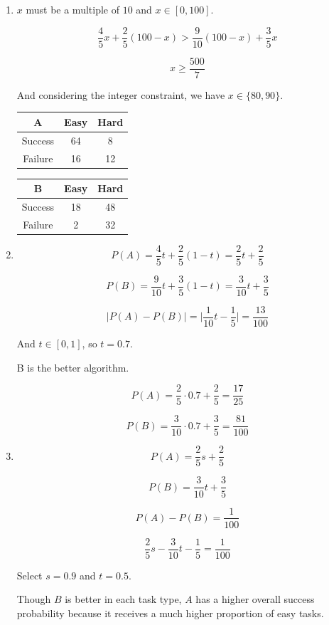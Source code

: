 \documentclass[11pt,a4paper]{article}
\begin{document}
\begin{enumerate}
    \item[(a)]

    $x$ must be a multiple of $10$ and $x \in [0,100]$.

    $$
    \frac{4}{5}x + \frac{2}{5}(100-x) > \frac{9}{10}(100-x) + \frac{3}{5}x
    $$

    $$
    x \geq \frac{500}{7}
    $$

    And considering the integer constraint, we have $x \in \{80, 90\}$.

    \begin{center}
    \begin{tabular}{ccc}
    \toprule A & Easy & Hard \\\midrule
    Success & 64 & 8 \\
    Failure & 16 & 12 \\\bottomrule
    \end{tabular}
    \end{center}

    \begin{center}
    \begin{tabular}{ccc}
    \toprule B & Easy & Hard \\\midrule
    Success & 18 & 48 \\
    Failure & 2 & 32 \\\bottomrule
    \end{tabular}
    \end{center}

    \item[(b)]
    
    $$
    P(A)=\frac{4}{5}t + \frac{2}{5}(1-t) = \frac{2}{5}t + \frac{2}{5}
    $$

    $$
    P(B)=\frac{9}{10}t + \frac{3}{5}(1-t) = \frac{3}{10}t + \frac{3}{5}
    $$

    $$
    \vert P(A) - P(B) \vert 
    = \vert \frac{1}{10}t - \frac{1}{5} \vert
    = \frac{13}{100}
    $$

    And $t \in [0,1]$, so $t = 0.7$.

    B is the better algorithm.

    $$
    P(A) = \frac{2}{5} \cdot 0.7 + \frac{2}{5} = \frac{17}{25}
    $$

    $$
    P(B) = \frac{3}{10} \cdot 0.7 + \frac{3}{5} = \frac{81}{100}
    $$

    \item[(c)]
    
    $$
    P(A) = \frac{2}{5}s + \frac{2}{5}
    $$

    $$
    P(B) = \frac{3}{10}t + \frac{3}{5}
    $$

    $$
    P(A) - P(B) = \frac{1}{100}
    $$

    $$
    \frac{2}{5}s - \frac{3}{10}t - \frac{1}{5} = \frac{1}{100}
    $$

    Select $s=0.9$ and $t=0.5$.

    Though $B$ is better in each task type, $A$ has a higher overall success probability because it receives a much higher proportion of easy tasks.
\end{enumerate}
\end{document}
